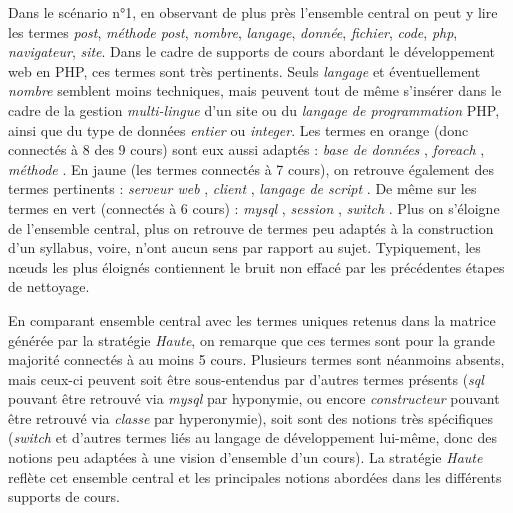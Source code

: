 Dans le scénario n°1, en observant de plus près l'ensemble central on peut y lire les termes \textit{post}, \textit{méthode post}, \textit{nombre}, \textit{langage}, \textit{donnée}, \textit{fichier}, \textit{code}, \textit{php}, \textit{navigateur}, \textit{site}.
Dans le cadre de supports de cours abordant le développement web en PHP, ces termes sont très pertinents.
Seuls \og \textit{langage} \fg et éventuellement \og \textit{nombre} \fg semblent moins techniques, mais peuvent tout de même s'insérer dans le cadre de la gestion \textit{multi-lingue} d'un site ou du \textit{langage de programmation} PHP, ainsi que du type de données \textit{entier} ou \textit{integer}.
Les termes en orange (donc connectés à 8 des 9 cours) sont eux aussi adaptés : \og \textit{base de données} \fg , \og \textit{foreach} \fg , \og \textit{méthode} \fg .
En jaune (les termes connectés à 7 cours), on retrouve également des termes pertinents : \og \textit{serveur web} \fg , \og \textit{client} \fg , \og \textit{langage de script} \fg .
De même sur les termes en vert (connectés à 6 cours) : \og \textit{mysql} \fg , \og \textit{session} \fg , \og \textit{switch} \fg .
Plus on s'éloigne de l'ensemble central, plus on retrouve de termes peu adaptés à la construction d'un syllabus, voire, n'ont aucun sens par rapport au sujet.
Typiquement, les n\oe{}uds les plus éloignés contiennent le bruit non effacé par les précédentes étapes de nettoyage.

\bigskip

En comparant ensemble central avec les termes uniques retenus dans la matrice générée par la stratégie \textit{Haute}, on remarque que ces termes sont pour la grande majorité connectés à au moins 5 cours.
Plusieurs termes sont néanmoins absents, mais ceux-ci peuvent soit être sous-entendus par d'autres termes présents (\og \textit{sql} \fg pouvant être retrouvé via \og \textit{mysql} \fg par hyponymie, ou encore \og \textit{constructeur} \fg pouvant être retrouvé via \og \textit{classe} \fg par hyperonymie), soit sont des notions très spécifiques (\og \textit{switch} \fg et d'autres termes liés au langage de développement lui-même, donc des notions peu adaptées à une vision d'ensemble d'un cours).
La stratégie \textit{Haute} reflète cet ensemble central et les principales notions abordées dans les différents supports de cours.

\bigskip

